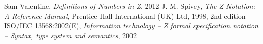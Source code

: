 \documentclass[12pt]{article}
\begin{document}
% 
\begin{thebibliography}{99}
	Sam Valentine,
  	\textit{Definitions of Numbers in Z},
    2012
    J. M. Spivey,
    \textit{The Z Notation: A Reference Manual},
    Prentice Hall International (UK) Ltd,
    1998,
    2nd edition
    ISO/IEC 13568:2002(E),
    \textit{Information technology -- Z formal specification notation -- Syntax, type system and semantics},
    2002
\end{thebibliography}
\end{document}
